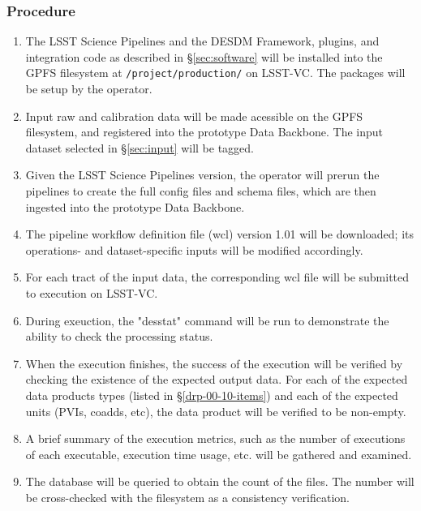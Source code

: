 \subsubsection{Procedure}

\begin{enumerate}

  \item{The LSST Science Pipelines and the DESDM Framework, plugins, and integration code as described in \S\ref{sec:software}  will be installed into the GPFS filesystem at \texttt{/project/production/} on LSST-VC. The packages will be setup by the operator.}
  \item{Input raw and calibration data will be made acessible on the GPFS filesystem, and registered into the prototype Data Backbone. The input dataset selected in \S\ref{sec:input} will be tagged.}
  \item{Given the LSST Science Pipelines version, the operator will prerun the pipelines to create the full config files and schema files, which are then ingested into the prototype Data Backbone.}
  \item{The pipeline workflow definition file (wcl) version 1.01 will be downloaded; its operations- and dataset-specific inputs will be modified accordingly.}
  \item{For each tract of the input data, the corresponding wcl file will be submitted to execution on LSST-VC.}
  \item{During exeuction, the "desstat" command will be run to demonstrate the ability to check the processing status.}
  \item{When the execution finishes, the success of the execution will be verified by checking the existence of the expected output data.
  For each of the expected data products types (listed in \S\ref{drp-00-10-items})
  and each of the expected units (PVIs, coadds, etc), the data product will be
  verified to be non-empty.}
  \item{A brief summary of the execution metrics, such as the number of executions of each executable, execution time usage, etc. will be gathered and examined.}
  \item{The database will be queried to obtain the count of the files. The number will be cross-checked with the filesystem as a consistency verification.}

\end{enumerate}
